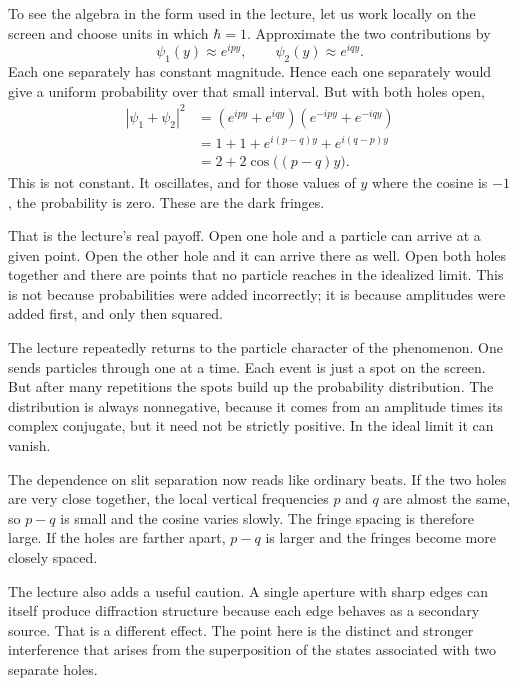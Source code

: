 To see the algebra in the form used in the lecture, let us work locally on the screen and choose units in which \(\hbar=1\). Approximate the two contributions by
\begin{equation}
\psi_1(y)\approx e^{ipy},
\qquad
\psi_2(y)\approx e^{iqy}.
\end{equation}
Each one separately has constant magnitude. Hence each one separately would give a uniform probability over that small interval. But with both holes open,
\begin{align}
|\psi_1+\psi_2|^2
 &= (e^{ipy}+e^{iqy})(e^{-ipy}+e^{-iqy}) \\
 &= 1+1+e^{i(p-q)y}+e^{i(q-p)y} \\
 &= 2+2\cos\bigl((p-q)y\bigr).
\end{align}
This is not constant. It oscillates, and for those values of \(y\) where the cosine is \(-1\), the probability is zero. These are the dark fringes.

That is the lecture's real payoff. Open one hole and a particle can arrive at a given point. Open the other hole and it can arrive there as well. Open both holes together and there are points that no particle reaches in the idealized limit. This is not because probabilities were added incorrectly; it is because amplitudes were added first, and only then squared.

The lecture repeatedly returns to the particle character of the phenomenon. One sends particles through one at a time. Each event is just a spot on the screen. But after many repetitions the spots build up the probability distribution. The distribution is always nonnegative, because it comes from an amplitude times its complex conjugate, but it need not be strictly positive. In the ideal limit it can vanish.

The dependence on slit separation now reads like ordinary beats. If the two holes are very close together, the local vertical frequencies \(p\) and \(q\) are almost the same, so \(p-q\) is small and the cosine varies slowly. The fringe spacing is therefore large. If the holes are farther apart, \(p-q\) is larger and the fringes become more closely spaced.

The lecture also adds a useful caution. A single aperture with sharp edges can itself produce diffraction structure because each edge behaves as a secondary source. That is a different effect. The point here is the distinct and stronger interference that arises from the superposition of the states associated with two separate holes.

